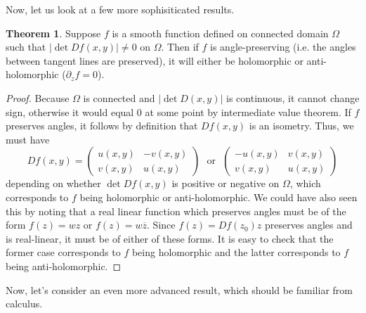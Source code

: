 \documentclass[aps,pra,showpacs,notitlepage,onecolumn,superscriptaddress,nofootinbib]{revtex4-1}
\theoremstyle{definition}
\newtheorem{theorem}{Theorem}[section]
\begin{document}
\noindent Now, let us look at a few more sophisiticated results.

\begin{theorem}
  Suppose $f$ is a smooth function defined on connected domain $\Omega$ such that $|\det Df(x, y)| \neq 0$ on $\Omega$. Then if $f$ is angle-preserving (i.e. the angles between tangent lines are preserved), it will either be holomorphic or anti-holomorphic ($\partial_z f = 0$).
\end{theorem}
\begin{proof}
  Because $\Omega$ is connected and $|\det D(x, y)|$ is continuous, it cannot change sign, otherwise it would equal $0$ at some point by intermediate value theorem. If $f$ preserves angles, it follows by definition that $Df(x, y)$ is an isometry.
  Thus, we must have
  \begin{equation}
    D f(x, y) = \begin{pmatrix} u(x, y) & -v(x, y) \\ v(x, y) & u(x, y) \end{pmatrix} \ \ \ \text{or} \ \ \  \begin{pmatrix} -u(x, y) & v(x, y) \\ v(x, y) & u(x, y) \end{pmatrix}
  \end{equation}
  depending on whether $\det Df(x, y)$ is positive or negative on $\Omega$, which corresponds to $f$ being holomorphic or anti-holomorphic. We could have also seen this by noting that a real linear function which preserves angles must be
  of the form $f(z) = w z$ or $f(z) = w \overline{z}$. Since $f(z) = Df(z_0) z$ preserves angles and is real-linear, it must be of either of these forms. It is easy to check that the former case corresponds to $f$ being holomorphic and the
  latter corresponds to $f$ being anti-holomorphic.
\end{proof}

\noindent Now, let's consider an even more advanced result, which should be familiar from calculus.
\end{document}
